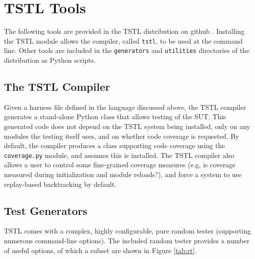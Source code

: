 \section{TSTL Tools}
\label{sec:tools}

The following tools are provided in the TSTL distribution on github \cite{tstl}.  Installing the TSTL module allows the compiler, called {\tt tstl}, to be used at the command line.  Other tools are included in the {\tt generators} and {\tt utilities} directories of the distribution as Python scripts.

\subsection{The TSTL Compiler}

Given a harness file defined in the language discussed above, the TSTL compiler generates a stand-alone Python class that allows testing of the SUT.  This generated code does not depend on the TSTL system being installed, only on any modules the testing itself uses, and on whether code coverage is requested.  By default, the compiler produces a class supporting code coverage using the {\tt coverage.py} module, and assumes this is installed.  The TSTL compiler also allows a user to control some fine-grained coverage measures (e.g, is coverage measured during initialization and module reloads?), and force a system to use replay-based backtracking by default.

\subsection{Test Generators}

TSTL comes with a complex, highly configurable, pure random tester (supporting numerous command-line options).  The included random tester provides a number of useful options, of which a subset are shown in Figure \ref{tab:rt}.   

